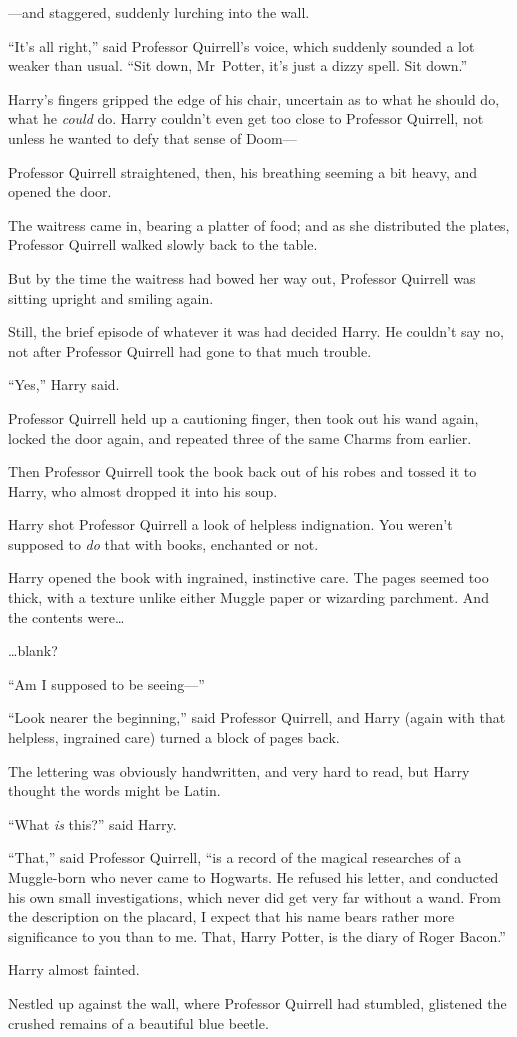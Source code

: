 —and staggered, suddenly lurching into the wall.

“It’s all right,” said Professor Quirrell’s voice, which suddenly sounded a lot weaker than usual.
“Sit down, Mr~Potter, it’s just a dizzy spell. Sit down.”

Harry’s fingers gripped the edge of his chair, uncertain as to what he should do, what he \emph{could} do. Harry couldn’t even get too close to Professor Quirrell, not unless he wanted to defy that sense of Doom—

Professor Quirrell straightened, then, his breathing seeming a bit heavy, and opened the door.

The waitress came in, bearing a platter of food; and as she distributed the plates, Professor Quirrell walked slowly back to the table.

But by the time the waitress had bowed her way out, Professor Quirrell was sitting upright and smiling again.

Still, the brief episode of whatever it was had decided Harry. He couldn’t say no, not after Professor Quirrell had gone to that much trouble.

“Yes,” Harry said.

Professor Quirrell held up a cautioning finger, then took out his wand again, locked the door again, and repeated three of the same Charms from earlier.

Then Professor Quirrell took the book back out of his robes and tossed it to Harry, who almost dropped it into his soup.

Harry shot Professor Quirrell a look of helpless indignation. You weren’t supposed to \emph{do} that with books, enchanted or not.

Harry opened the book with ingrained, instinctive care. The pages seemed too thick, with a texture unlike either Muggle paper or wizarding parchment. And the contents were…

…blank?

“Am I supposed to be seeing—”

“Look nearer the beginning,” said Professor Quirrell, and Harry (again with that helpless, ingrained care) turned a block of pages back.

The lettering was obviously handwritten, and very hard to read, but Harry thought the words might be Latin.

“What \emph{is} this?” said Harry.

“That,” said Professor Quirrell, “is a record of the magical researches of a Muggle-born who never came to Hogwarts. He refused his letter, and conducted his own small investigations, which never did get very far without a wand. From the description on the placard, I expect that his name bears rather more significance to you than to me. That, Harry Potter, is the diary of Roger Bacon.”

Harry almost fainted.

Nestled up against the wall, where Professor Quirrell had stumbled, glistened the crushed remains of a beautiful blue beetle.

